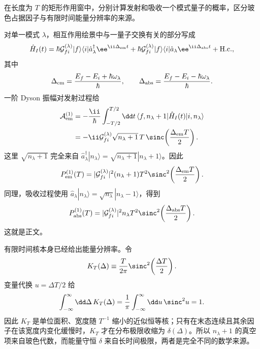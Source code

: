 \begin{derivation}[单模发射与吸收的有限时间谱核]
在长度为 $T$ 的矩形作用窗中，分别计算发射和吸收一个模式量子的概率，区分玻色占据因子与有限时间能量分辨率的来源。

对单一模式 $\lambda$，相互作用绘景中与一量子交换有关的部分写成
\[
\hat H_I(t)
=\hbar\mathcal G_{fi}^{(\lambda)}
|f\rangle\langle i|\hat a_\lambda^\dagger
 \ee^{\ii\Delta_{\rm em}t}
+\hbar\mathcal G_{fi}^{(\lambda)}
|f\rangle\langle i|\hat a_\lambda
 \ee^{\ii\Delta_{\rm abs}t}
+\mathrm{H.c.},
\]
其中
\[
\Delta_{\rm em}
=\frac{E_f-E_i+\hbar\omega_\lambda}{\hbar},
\qquad
\Delta_{\rm abs}
=\frac{E_f-E_i-\hbar\omega_\lambda}{\hbar}.
\]
一阶 Dyson 振幅对发射过程给
\begin{align*}
\mathcal A_{\rm em}^{(1)}
&=-\frac{\ii}{\hbar}
\int_{-T/2}^{T/2}\dd t\,
\langle f,n_\lambda+1|\hat H_I(t)|i,n_\lambda\rangle\\
&=-\ii\mathcal G_{fi}^{(\lambda)}\sqrt{n_\lambda+1}
\,T\,\sinc\!\left(\frac{\Delta_{\rm em}T}{2}\right).
\end{align*}
这里 $\sqrt{n_\lambda+1}$ 完全来自
$\hat a_\lambda^\dagger|n_\lambda\rangle
=\sqrt{n_\lambda+1}|n_\lambda+1\rangle$。因此
\[
P_{\rm em}^{(1)}(T)
=|\mathcal G_{fi}^{(\lambda)}|^2(n_\lambda+1)T^2
\sinc^2\!\left(\frac{\Delta_{\rm em}T}{2}\right).
\]
同理，吸收过程使用
$\hat a_\lambda|n_\lambda\rangle=\sqrt{n_\lambda}|n_\lambda-1\rangle$，得到
\[
P_{\rm abs}^{(1)}(T)
=|\mathcal G_{fi}^{(\lambda)}|^2n_\lambda T^2
\sinc^2\!\left(\frac{\Delta_{\rm abs}T}{2}\right).
\]
这就是正文。

有限时间核本身已经给出能量分辨率。令
\[
K_T(\Delta)
\equiv\frac{T}{2\pi}\sinc^2\!\left(\frac{\Delta T}{2}\right).
\]
变量代换 $u=\Delta T/2$ 给
\[
\int_{-\infty}^{\infty}\dd\Delta\,K_T(\Delta)
=\frac1\pi\int_{-\infty}^{\infty}\dd u\,\sinc^2u=1.
\]
因此 $K_T$ 是单位面积、宽度随 $T^{-1}$ 缩小的近似恒等核；只有在末态连续且其余因子在该宽度内变化缓慢时，$K_T$ 才在分布极限收缩为 $\delta(\Delta)$。所以 $n_\lambda+1$ 的真空项来自玻色代数，而能量守恒 $\delta$ 来自长时间极限，两者是完全不同的数学来源。
\end{derivation}
